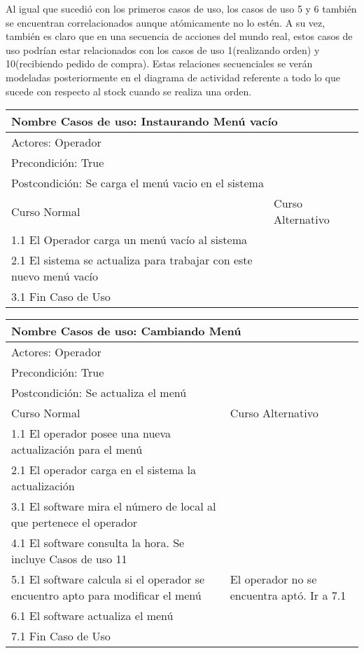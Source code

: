 \documentclass[a4paper,10pt]{article}
\begin{document}
\bigskip
Al igual que sucedi\'o con los primeros casos de uso, los casos de uso 5 y 6 tambi\'en se encuentran correlacionados aunque at\'omicamente no lo est\'en.
A su vez, tambi\'en es claro que en una secuencia de acciones del mundo real, estos casos de uso podr\'ian estar relacionados con los casos
de uso 1(realizando orden) y 10(recibiendo pedido de compra). Estas relaciones secuenciales se ver\'an modeladas posteriormente en el diagrama de actividad
referente a todo lo que sucede con respecto al stock cuando se realiza una orden.

\bigskip


\begin{center}
\begin{tabularx}{14cm}{|X|X|}
\hline
\multicolumn{2}{|l|}{Nombre Casos de uso: Instaurando Men\'u vac\'io}\\
\hline
\multicolumn{2}{|l|}{Actores: Operador}\\
\hline
\multicolumn{2}{|l|}{Precondici\'on: True}\\
\hline
\multicolumn{2}{|l|}{Postcondici\'on: Se carga el men\'u vacio en el sistema}\\
\hline
Curso Normal & Curso Alternativo\\
\hline
1.1 El Operador carga un men\'u vac\'io al sistema & 
\\
\hline
2.1 El sistema se actualiza para trabajar con este nuevo men\'u vac\'io & 
\\
\hline
3.1 Fin Caso de Uso &
\\
\hline
\end{tabularx}
\end{center}

\bigskip

\begin{center}
\begin{tabularx}{14cm}{|X|X|}
\hline
\multicolumn{2}{|l|}{Nombre Casos de uso: Cambiando Men\'u}\\
\hline
\multicolumn{2}{|l|}{Actores: Operador}\\
\hline
\multicolumn{2}{|l|}{Precondici\'on: True}\\
\hline
\multicolumn{2}{|l|}{Postcondici\'on: Se actualiza el men\'u}\\
\hline
Curso Normal & Curso Alternativo\\
\hline
1.1 El operador posee una nueva actualizaci\'on para el men\'u & 
\\
\hline
2.1 El operador carga en el sistema la actualizaci\'on & 
\\
\hline
3.1 El software mira el n\'umero de local al que pertenece el operador &
\\
\hline
4.1 El software consulta la hora. Se incluye Casos de uso 11 &
\\
\hline
5.1 El software calcula si el operador se encuentro apto para modificar el men\'u & El operador no se encuentra apt\'o. Ir a 7.1
\\
\hline
6.1 El software actualiza el men\'u &
\\
\hline
7.1 Fin Caso de Uso &
\\
\hline
\end{tabularx}
\end{center}
\end{document}
